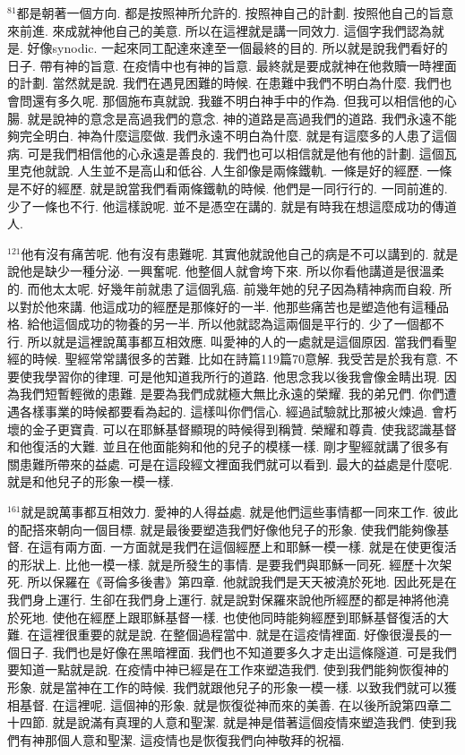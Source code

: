 \documentclass{book}
\begin{document}
$^{81}$都是朝著一個方向.
都是按照神所允許的.
按照神自己的計劃.
按照他自己的旨意來前進.
來成就神他自己的美意.
所以在這裡就是講一同效力.
這個字我們認為就是.
好像synodic.
一起來同工配達來達至一個最終的目的.
所以就是說我們看好的日子.
帶有神的旨意.
在疫情中也有神的旨意.
最終就是要成就神在他救贖一時裡面的計劃.
當然就是說.
我們在遇見困難的時候.
在患難中我們不明白為什麼.
我們也會問還有多久呢.
那個施布真就說.
我雖不明白神手中的作為.
但我可以相信他的心腸.
就是說神的意念是高過我們的意念.
神的道路是高過我們的道路.
我們永遠不能夠完全明白.
神為什麼這麼做.
我們永遠不明白為什麼.
就是有這麼多的人患了這個病.
可是我們相信他的心永遠是善良的.
我們也可以相信就是他有他的計劃.
這個瓦里克他就說.
人生並不是高山和低谷.
人生卻像是兩條鐵軌.
一條是好的經歷.
一條是不好的經歷.
就是說當我們看兩條鐵軌的時候.
他們是一同行行的.
一同前進的.
少了一條也不行.
他這樣說呢.
並不是憑空在講的.
就是有時我在想這麼成功的傳道人.

$^{121}$他有沒有痛苦呢.
他有沒有患難呢.
其實他就說他自己的病是不可以講到的.
就是說他是缺少一種分泌.
一興奮呢.
他整個人就會垮下來.
所以你看他講道是很溫柔的.
而他太太呢.
好幾年前就患了這個乳癌.
前幾年她的兒子因為精神病而自殺.
所以對於他來講.
他這成功的經歷是那條好的一半.
他那些痛苦也是塑造他有這種品格.
給他這個成功的物養的另一半.
所以他就認為這兩個是平行的.
少了一個都不行.
所以就是這裡說萬事都互相效應.
叫愛神的人的一處就是這個原因.
當我們看聖經的時候.
聖經常常講很多的苦難.
比如在詩篇119篇70意解.
我受苦是於我有意.
不要使我學習你的律理.
可是他知道我所行的道路.
他思念我以後我會像金睛出現.
因為我們短暫輕微的患難.
是要為我們成就極大無比永遠的榮耀.
我的弟兄們.
你們遭遇各樣事業的時候都要看為起的.
這樣叫你們信心.
經過試驗就比那被火煉過.
會朽壞的金子更寶貴.
可以在耶穌基督顯現的時候得到稱贊.
榮耀和尊貴.
使我認識基督和他復活的大難.
並且在他面能夠和他的兒子的模樣一樣.
剛才聖經就講了很多有關患難所帶來的益處.
可是在這段經文裡面我們就可以看到.
最大的益處是什麼呢.
就是和他兒子的形象一模一樣.

$^{161}$就是說萬事都互相效力.
愛神的人得益處.
就是他們這些事情都一同來工作.
彼此的配搭來朝向一個目標.
就是最後要塑造我們好像他兒子的形象.
使我們能夠像基督.
在這有兩方面.
一方面就是我們在這個經歷上和耶穌一模一樣.
就是在使更復活的形狀上.
比他一模一樣.
就是所發生的事情.
是要我們與耶穌一同死.
經歷十次架死.
所以保羅在《哥倫多後書》第四章.
他就說我們是天天被澆於死地.
因此死是在我們身上運行.
生卻在我們身上運行.
就是說對保羅來說他所經歷的都是神將他澆於死地.
使他在經歷上跟耶穌基督一樣.
也使他同時能夠經歷到耶穌基督復活的大難.
在這裡很重要的就是說.
在整個過程當中.
就是在這疫情裡面.
好像很漫長的一個日子.
我們也是好像在黑暗裡面.
我們也不知道要多久才走出這條隧道.
可是我們要知道一點就是說.
在疫情中神已經是在工作來塑造我們.
使到我們能夠恢復神的形象.
就是當神在工作的時候.
我們就跟他兒子的形象一模一樣.
以致我們就可以獲相基督.
在這裡呢.
這個神的形象.
就是恢復從神而來的美善.
在以後所說第四章二十四節.
就是說滿有真理的人意和聖潔.
就是神是借著這個疫情來塑造我們.
使到我們有神那個人意和聖潔.
這疫情也是恢復我們向神敬拜的祝福.
\end{document}
